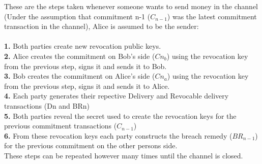 These are the steps taken whenever someone wants to send money in the channel (Under the assumption that commitment n-1 ($C_{n-1}$) was the latest commitment transaction in the channel), Alice is assumed to be the sender:\\\\
	\textbf{1.} Both parties create new revocation public keys.\\
	\textbf{2.} Alice creates the commitment on Bob's side ($Cn_{b}$) using the revocation key from the previous step, signs it and sends it to Bob.\\
	\textbf{3.} Bob creates the commitment on Alice's side ($Cn_{a}$) using the revocation key from the previous step, signs it and sends it to Alice.\\
	\textbf{4.} Each party generates their repective Delivery and Revocable delivery transactions (Dn and BRn)\\
	\textbf{5.} Both parties reveal the secret used to create the revocation keys for the previous commitment transactions ($C_{n-1}$)\\
	\textbf{6.} From these revocation keys each party constructs the breach remedy ($BR_{n-1}$) for the previous commitment on the other persons side.\\

These steps can be repeated however many times until the channel is closed. 

